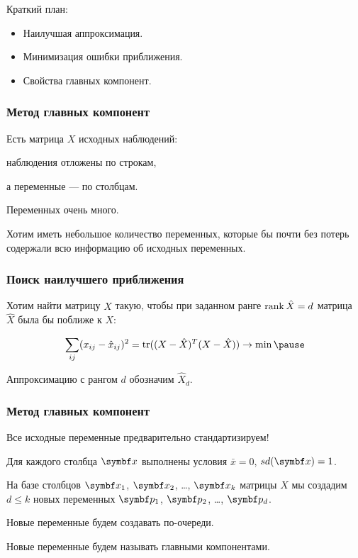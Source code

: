 
\begin{frame} %


\end{frame}



\begin{frame}{Краткий план:}
  \begin{itemize}[<+->]
    \item Наилучшая аппроксимация.
    \item Минимизация ошибки приближения.
  \item Свойства главных компонент.
  \end{itemize}

\end{frame}




\begin{frame}
  \frametitle{Метод главных компонент}


  Есть матрица $X$ исходных наблюдений:

  наблюдения отложены по строкам, 
  
  а переменные — по столбцам. 


  Переменных очень много. 


  Хотим иметь небольшое количество переменных, 
  которые бы почти без потерь 
  содержали всю информацию об исходных переменных. 


\end{frame}


\begin{frame}
  \frametitle{Поиск наилучшего приближения}

  Хотим найти матрицу $\hat X$ такую, чтобы
  при заданном ранге $\rank \hat X = d$ матрица $\hat X$ была бы поближе к $X$:

  \[
  \sum_{ij} (x_{ij} - \hat x_{ij})^2 = \trace ((X - \hat X)^T (X - \hat X)) \to \min \pause 
  \]

  Аппроксимацию с рангом $d$ обозначим $\hat X_d$.
  
\end{frame}


\begin{frame}
  \frametitle{Метод главных компонент}

  Все исходные переменные предварительно стандартизируем! 

  Для каждого столбца $\bx$ выполнены условия $\bar x =0$, $sd(\bx)=1$. 


  На базе столбцов $\bx_1$, $\bx_2$, \ldots, $\bx_k$ матрицы $X$ мы создадим 
  $d\leq k$ новых переменных $\bp_1$, $\bp_2$, \ldots, $\bp_d$. 

  Новые переменные будем создавать по-очереди. 

  Новые переменные будем называть \alert{главными компонентами}.


\end{frame}


